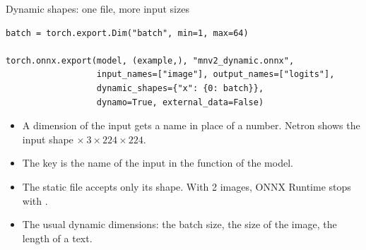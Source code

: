 \begin{frame}[fragile]{Dynamic shapes: one file, more input sizes}
\begin{lstlisting}[style=python]
batch = torch.export.Dim("batch", min=1, max=64)

torch.onnx.export(model, (example,), "mnv2_dynamic.onnx",
                  input_names=["image"], output_names=["logits"],
                  dynamic_shapes={"x": {0: batch}},
                  dynamo=True, external_data=False)
\end{lstlisting}
  \small
  \begin{itemize}
    \item A dimension of the input gets a name in place of a number. Netron
          shows the input shape  $\times\ 3 \times 224 \times
          224$.
    \item The key  is the name of the input in the function
           of the model.
    \item The static file accepts only its shape. With 2 images, ONNX
          Runtime stops with .
    \item The usual dynamic dimensions: the batch size, the size of the
          image, the length of a text.
  \end{itemize}
\end{frame}

